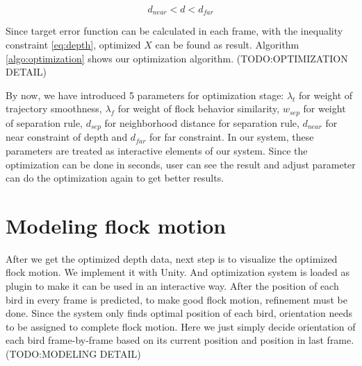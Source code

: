 \begin{equation}\label{eq:depth}
d_{near} < d < d_{far}
\end{equation}

Since target error function can be calculated in each frame, with the inequality constraint \ref{eq:depth}, optimized $X$ can be found as result.  Algorithm \ref{algo:optimization}  shows our optimization algorithm.
(TODO:OPTIMIZATION DETAIL)


By now, we have introduced 5 parameters for optimization stage: $\lambda_{t}$ for weight of trajectory smoothness, $\lambda_{f}$ for weight of flock behavior similarity, $w_{sep}$ for weight of separation rule, $d_{sep}$ for neighborhood distance for separation rule, $d_{near}$ for near constraint of depth and $d_{far}$ for far constraint. In our system, these parameters are treated as interactive elements of our system. Since the optimization can be done in seconds, user can see the result and adjust parameter can do the optimization again to get better results. 


\section{Modeling flock motion}


After we get the optimized depth data, next step is to visualize the optimized flock motion. We implement it with Unity\cite{Unity}. And optimization system is loaded as plugin to make it can be used in an interactive way.
After the position of each bird in every frame is predicted, to make good flock motion, refinement must be done. Since the system only finds optimal position of each bird, orientation needs to be assigned to complete flock motion. Here we just simply decide orientation of each bird frame-by-frame based on its current position and position in last frame.
(TODO:MODELING DETAIL)
